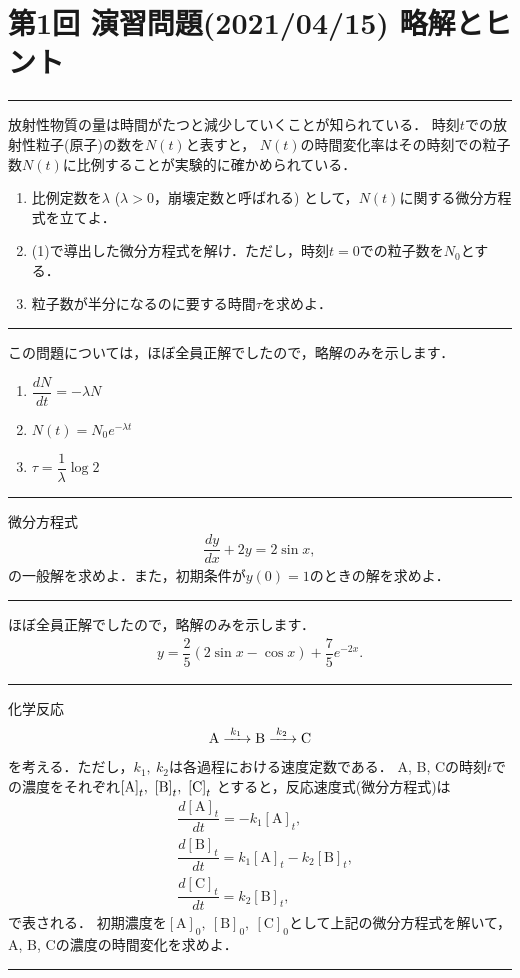\documentclass[11pt,a4]{jsarticle}
\numberwithin{equation}{section}
\begin{document}
\section*{第1回 演習問題(2021/04/15) 略解とヒント}
%
\hrule
\vspace*{.2cm}
\enshu
放射性物質の量は時間がたつと減少していくことが知られている．
時刻$t$での放射性粒子(原子)の数を$N(t)$と表すと，
$N(t)$の時間変化率はその時刻での粒子数$N(t)$に比例することが実験的に確かめられている．
\begin{enumerate}[(1)]
  \item 比例定数を$\lambda$ ($\lambda>0$，崩壊定数と呼ばれる) として，$N(t)$に関する微分方程式を立てよ．
  \item (1)で導出した微分方程式を解け．ただし，時刻$t=0$での粒子数を$N_0$とする．
  \item 粒子数が半分になるのに要する時間$\tau$を求めよ．
\end{enumerate}
\hrule
\vspace*{.2cm}

\setcounter{section}{1}
\noindent

この問題については，ほぼ全員正解でしたので，略解のみを示します．
\begin{enumerate}[(1)]
  \item $\dfrac{dN}{dt} = -\lambda N$
  \item $N(t) = N_{0}e^{-\lambda t}$
  \item $\tau = \dfrac{1}{\lambda} \log 2 $ 
\end{enumerate}
%
\newpage
\hrule
\vspace*{.2cm}
\enshu
微分方程式
\begin{align*}
  \dfrac{dy}{dx} + 2y = 2\sin x, 
\end{align*}
の一般解を求めよ．また，初期条件が$y(0)=1$のときの解を求めよ．
\vspace*{.2cm}
\hrule
\vspace*{.2cm}

ほぼ全員正解でしたので，略解のみを示します．
\begin{align*}
  y = \dfrac{2}{5}\left(2\sin x - \cos x\right)  + \dfrac{7}{5}e^{-2x}.
\end{align*}

\newpage
\hrule
\vspace*{.2cm}
\enshu
化学反応
\begin{align*}
 \ce{A ->[k_1] B ->[k_2] C}  
\end{align*}
を考える．ただし，$k_1,~k_2$は各過程における速度定数である．
A, B, Cの時刻$t$での濃度をそれぞれ$\ce{[A]}_t,~\ce{[B]}_t,~\ce{[C]}_t$
とすると，反応速度式(微分方程式)は
\begin{align*}
  &\dfrac{d[\mathrm{A}]_t}{dt} = -k_1 [\mathrm{A}]_t, \\
  &\dfrac{d[\mathrm{B}]_t}{dt} =  k_1 [\mathrm{A}]_t - k_2 [\mathrm{B}]_t, \\
  &\dfrac{d[\mathrm{C}]_t}{dt} =  k_2 [\mathrm{B}]_t, 
\end{align*}
で表される．
初期濃度を$[\mathrm{A}]_0,~[\mathrm{B}]_0,~[\mathrm{C}]_0$として上記の微分方程式を解いて，
A, B, Cの濃度の時間変化を求めよ．
\vspace*{.2cm}
\hrule
\vspace*{.2cm}
\end{document}
